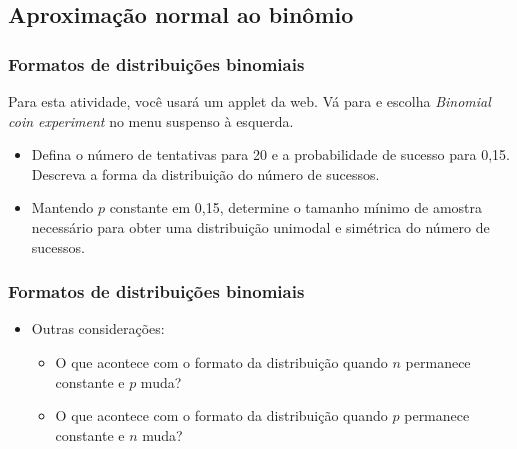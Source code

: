 \subsection{Aproximação normal ao binômio}


\begin{frame}
\frametitle{Formatos de distribuições binomiais}
\justifying
{}
{
\justifying
Para esta atividade, você usará um applet da web. Vá para  e escolha \textit{Binomial coin experiment} no menu suspenso à esquerda.
\begin{itemize}
\justifying
\item Defina o número de tentativas para 20 e a probabilidade de sucesso para 0,15. Descreva a forma da distribuição do número de sucessos.
\justifying
\item Mantendo $ p $ constante em 0,15, determine o tamanho mínimo de amostra necessário para obter uma distribuição unimodal e simétrica do número de sucessos.
\end{itemize}
}

\end{frame}

\begin{frame}
\frametitle{Formatos de distribuições binomiais}
\begin{itemize}
\justifying
\item Outras considerações:
\begin{itemize}
\justifying
\item O que acontece com o formato da distribuição quando $ n $ permanece constante e $ p $ muda?
\justifying
\item O que acontece com o formato da distribuição quando $ p $ permanece constante e $ n $ muda?
\end{itemize}
\end{itemize}


\end{frame}


